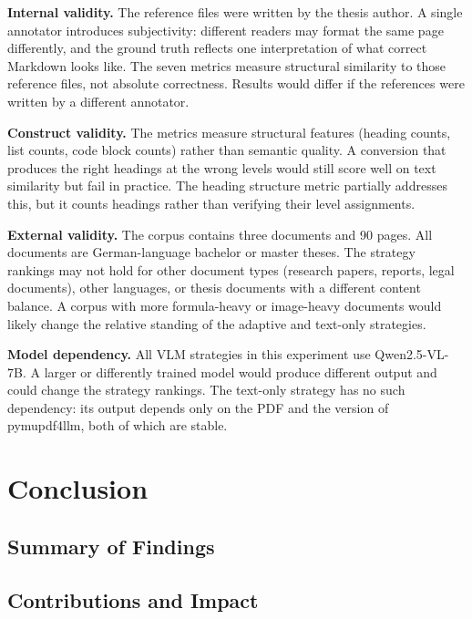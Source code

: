 \documentclass[12pt]{article}
\begin{document}
\textbf{Internal validity.} The reference files were written by the
thesis author. A single annotator introduces subjectivity: different
readers may format the same page differently, and the ground truth
reflects one interpretation of what correct Markdown looks like. The
seven metrics measure structural similarity to those reference files,
not absolute correctness. Results would differ if the references were
written by a different annotator.

\textbf{Construct validity.} The metrics measure structural features
(heading counts, list counts, code block counts) rather than semantic
quality. A conversion that produces the right headings at the wrong
levels would still score well on text similarity but fail in practice.
The heading structure metric partially addresses this, but it counts
headings rather than verifying their level assignments.

\textbf{External validity.} The corpus contains three documents and
90 pages. All documents are German-language bachelor or master theses.
The strategy rankings may not hold for other document types (research
papers, reports, legal documents), other languages, or thesis documents
with a different content balance. A corpus with more formula-heavy or
image-heavy documents would likely change the relative standing of the
adaptive and text-only strategies.

\textbf{Model dependency.} All VLM strategies in this experiment use
Qwen2.5-VL-7B. A larger or differently trained model would produce
different output and could change the strategy rankings. The text-only
strategy has no such dependency: its output depends only on the PDF
and the version of pymupdf4llm, both of which are stable.


\section{Conclusion}

\subsection{Summary of Findings}

\subsection{Contributions and Impact}
\end{document}
